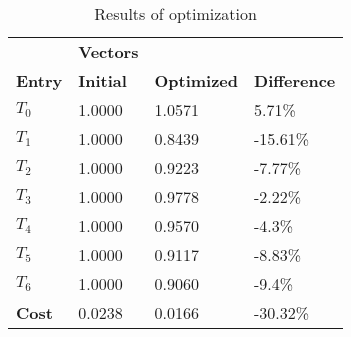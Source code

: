 \begin{table}[h!]
\centering
\begin{tabular}{llll}
\textbf{}      & \cellcolor[HTML]{EFEFEF}\textbf{Vectors} & \textbf{} & \textbf{}         \\
\rowcolor[HTML]{EFEFEF} 
\textbf{Entry} & \textbf{Initial} & \textbf{Optimized} & \textbf{Difference} \\
$T_0$ & 1.0000 & 1.0571 & 5.71\% \\ 
$T_1$ & 1.0000 & 0.8439 & -15.61\% \\ 
$T_2$ & 1.0000 & 0.9223 & -7.77\% \\ 
$T_3$ & 1.0000 & 0.9778 & -2.22\% \\ 
$T_4$ & 1.0000 & 0.9570 & -4.3\% \\ 
$T_5$ & 1.0000 & 0.9117 & -8.83\% \\ 
$T_6$ & 1.0000 & 0.9060 & -9.4\% \\ 
\rowcolor[HTML]{EFEFEF} 
\textbf{Cost}  & 0.0238 & 0.0166 & -30.32\% \\ 
\end{tabular}
\caption{Results of optimization}
\label{tab:OptimizationAnalysis}
\end{table}